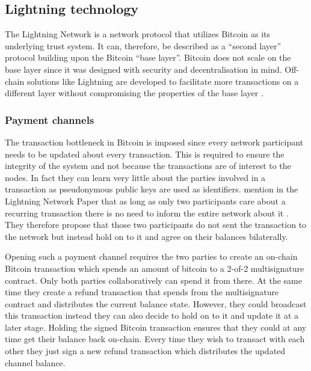 \documentclass[final]{fhnwreport}       %
\begin{document}
\subsection{Lightning technology}
The Lightning Network is a network protocol that utilizes Bitcoin as its underlying trust system. It can, therefore, be described as a ``second layer'' protocol building upon the Bitcoin ``base layer''. Bitcoin does not scale on the base layer since it was designed with security and decentralisation in mind. Off-chain solutions like Lightning are developed to facilitate more transactions on a different layer without compromising the properties of the base layer \citep{poon_bitcoin_2016}.

\subsubsection{Payment channels}
The transaction bottleneck in Bitcoin is imposed since every network participant needs to be updated about every transaction. This is required to ensure the integrity of the system and not because the transactions are of interest to the nodes. In fact they can learn very little about the parties involved in a transaction as pseudonymous public keys are used as identifiers. \citeauthor{poon_bitcoin_2016} mention in the Lightning Network Paper that as long as only two participants care about a recurring transaction there is no need to inform the entire network about it \citep{poon_bitcoin_2016}. They therefore propose that those two participants do not sent the transaction to the network but instead hold on to it and agree on their balances bilaterally. 

Opening such a payment channel requires the two parties to create an on-chain Bitcoin transaction which spends an amount of bitcoin to a 2-of-2 multisignature contract. Only both parties collaboratively can spend it from there. At the same time they create a refund transaction that spends from the multisignature contract and distributes the current balance state. However, they could broadcast this transaction instead they can also decide to hold on to it and update it at a later stage. Holding the signed Bitcoin transaction ensures that they could at any time get their balance back on-chain. Every time they wish to transact with each other they just sign a new refund transaction which distributes the updated channel balance.
\end{document}
